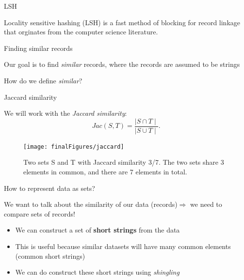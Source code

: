 \documentclass[
  ignorenonframetext,
]{beamer}
\providecommand{\tightlist}{%
  \setlength{\itemsep}{0pt}\setlength{\parskip}{0pt}}
\begin{document}
\begin{frame}{LSH}
\protect\hypertarget{lsh}{}

Locality sensitive hashing (LSH) is a fast method of blocking for record
linkage that orginates from the computer science literature.

\end{frame}

\begin{frame}{Finding similar records}
\protect\hypertarget{finding-similar-records}{}

Our goal is to find \emph{similar} records, where the records are
assumed to be strings \vfill

How do we define \emph{similar}? \vfill

\end{frame}

\begin{frame}{Jaccard similarity}
\protect\hypertarget{jaccard-similarity}{}

We will work with the \emph{Jaccard similarity}: \[
Jac(S, T) = \frac{\mid S \cap T\mid}{\mid S \cup T \mid}.
\]

\begin{figure}[h]
\centering
\texttt{[image: finalFigures/jaccard]}
\caption{Two sets S and T with Jaccard similarity 3/7. The two sets share 3 elements in common, and there are 7 elements in total.}
\label{fig:jaccard}
\end{figure}

\end{frame}

\begin{frame}{How to represent data as sets?}
\protect\hypertarget{how-to-represent-data-as-sets}{}

We want to talk about the similarity of our data
(records)\(\Rightarrow\) we need to compare sets of records!

\begin{itemize}
\tightlist
\item
  We can construct a set of \textbf{short strings} from the data \vfill
\item
  This is useful because similar datasets will have many common elements
  (common short strings) \vfill
\item
  We can do construct these short strings using \emph{shingling} \vfill
\end{itemize}

\end{frame}
\end{document}
